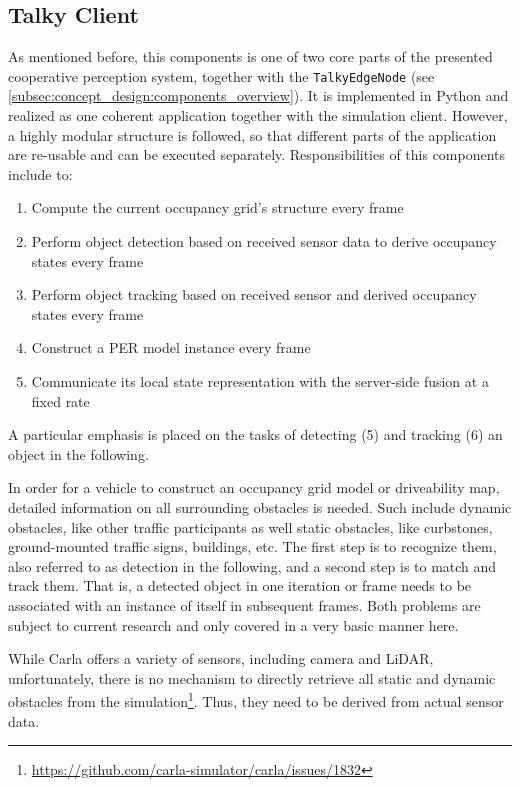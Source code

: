 \subsection{Talky Client}
\label{subsec:implementation:talky_client}
As mentioned before, this components is one of two core parts of the presented cooperative perception system, together with the \texttt{TalkyEdgeNode} (see \cref{subsec:concept_design:components_overview}). It is implemented in Python and realized as one coherent application together with the simulation client. However, a highly modular structure is followed, so that different parts of the application are re-usable and can be executed separately. Responsibilities of this components include to:

\begin{enumerate}
	\item Compute the current occupancy grid's structure every frame
	\item Perform object detection based on received sensor data to derive occupancy states every frame
	\item Perform object tracking based on received sensor and derived occupancy states every frame
	\item Construct a PER model instance every frame
	\item Communicate its local state representation with the server-side fusion at a fixed rate
\end{enumerate}

A particular emphasis is placed on the tasks of detecting (5) and tracking (6) an object in the following. 

In order for a vehicle to construct an occupancy grid model or driveability map, detailed information on all surrounding obstacles is needed. Such include dynamic obstacles, like other traffic participants as well static obstacles, like curbstones, ground-mounted traffic signs, buildings, etc. The first step is to recognize them, also referred to as detection in the following, and a second step is to match and track them. That is, a detected object in one iteration or frame needs to be associated with an instance of itself in subsequent frames. Both problems are subject to current research and only covered in a very basic manner here.

While Carla offers a variety of sensors, including camera and LiDAR, unfortunately, there is no mechanism to directly retrieve all static and dynamic obstacles from the simulation\footnote{\url{https://github.com/carla-simulator/carla/issues/1832}}. Thus, they need to be derived from actual sensor data. 
\par
\bigskip

